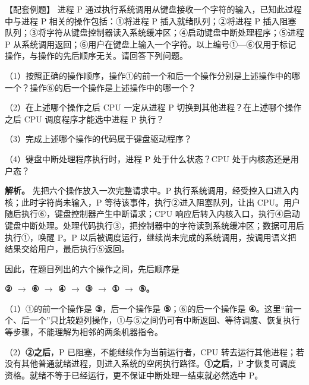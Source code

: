 \begin{example}[配套例题]

【配套例题】 进程 P 通过执行系统调用从键盘接收一个字符的输入，已知此过程中与进程 P 相关的操作包括：{\SNsymbolfont ①}将进程 P 插入就绪队列；{\SNsymbolfont ②}将进程 P 插入阻塞队列；{\SNsymbolfont ③}将字符从键盘控制器读入系统缓冲区；{\SNsymbolfont ④}启动键盘中断处理程序；{\SNsymbolfont ⑤}进程 P 从系统调用返回；{\SNsymbolfont ⑥}用户在键盘上输入一个字符。以上编号{\SNsymbolfont ①}---{\SNsymbolfont ⑥}仅用于标记操作，与操作的先后顺序无关。请回答下列问题。

（1）按照正确的操作顺序，操作{\SNsymbolfont ①}的前一个和后一个操作分别是上述操作中的哪一个？操作{\SNsymbolfont ⑥}的后一个操作是上述操作中的哪一个？

（2）在上述哪个操作之后 CPU 一定从进程 P 切换到其他进程？在上述哪个操作之后 CPU 调度程序才能选中进程 P 执行？

（3）完成上述哪个操作的代码属于键盘驱动程序？

（4）键盘中断处理程序执行时，进程 P 处于什么状态？CPU 处于内核态还是用户态？

\end{example}

\textbf{解析。} 先把六个操作放入一次完整请求中。P 执行系统调用，经受控入口进入内核；此时字符尚未输入，P 等待该事件，执行{\SNsymbolfont ②}进入阻塞队列，让出 CPU。用户随后执行{\SNsymbolfont ⑥}，键盘控制器产生中断请求；CPU 响应后转入内核入口，执行{\SNsymbolfont ④}启动键盘中断处理。处理代码执行{\SNsymbolfont ③}，把控制器中的字符读到系统缓冲区；数据可用后执行{\SNsymbolfont ①}，唤醒 P。P 以后被调度运行，继续尚未完成的系统调用，按调用语义把结果交给用户，最后执行{\SNsymbolfont ⑤}返回。

因此，在题目列出的六个操作之间，先后顺序是

\textbf{{\SNsymbolfont ②} \ensuremath{\to} {\SNsymbolfont ⑥} \ensuremath{\to} {\SNsymbolfont ④} \ensuremath{\to} {\SNsymbolfont ③} \ensuremath{\to} {\SNsymbolfont ①} \ensuremath{\to} {\SNsymbolfont ⑤}。}

（1）{\SNsymbolfont ①}的前一个操作是 \textbf{{\SNsymbolfont ③}}，后一个操作是 \textbf{{\SNsymbolfont ⑤}}；{\SNsymbolfont ⑥}的后一个操作是 \textbf{{\SNsymbolfont ④}}。这里``前一个、后一个''只比较题列操作，{\SNsymbolfont ①}与{\SNsymbolfont ⑤}之间仍可有中断返回、等待调度、恢复执行等步骤，不能理解为相邻的两条机器指令。

（2）\textbf{{\SNsymbolfont ②}之后}，P 已阻塞，不能继续作为当前运行者，CPU 转去运行其他进程；若没有其他普通就绪进程，则进入系统的空闲执行路径。\textbf{{\SNsymbolfont ①}之后}，P 才恢复可调度资格。就绪不等于已经运行，更不保证中断处理一结束就必然选中 P。


